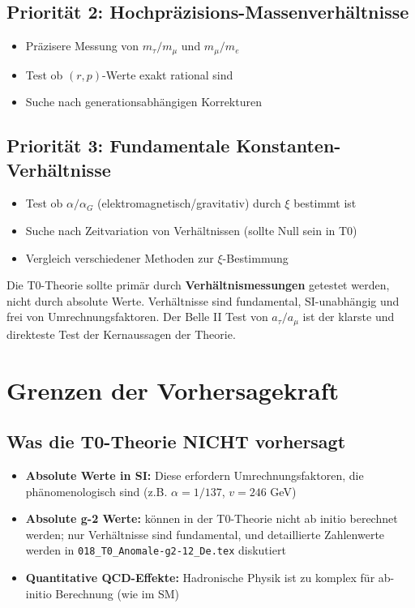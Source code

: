 \subsection{Priorität 2: Hochpräzisions-Massenverhältnisse}

\begin{itemize}
	\item Präzisere Messung von $m_\tau/m_\mu$ und $m_\mu/m_e$
	\item Test ob $(r,p)$-Werte exakt rational sind
	\item Suche nach generationsabhängigen Korrekturen
\end{itemize}

\subsection{Priorität 3: Fundamentale Konstanten-Verhältnisse}

\begin{itemize}
	\item Test ob $\alpha/\alpha_G$ (elektromagnetisch/gravitativ) durch $\xi$ bestimmt ist
	\item Suche nach Zeitvariation von Verhältnissen (sollte Null sein in T0)
	\item Vergleich verschiedener Methoden zur $\xi$-Bestimmung
\end{itemize}

\begin{keypoint}
	Die T0-Theorie sollte primär durch \textbf{Verhältnismessungen} getestet werden, 
	nicht durch absolute Werte. Verhältnisse sind fundamental, SI-unabhängig und 
	frei von Umrechnungsfaktoren. Der Belle II Test von $a_\tau/a_\mu$ ist der 
	klarste und direkteste Test der Kernaussagen der Theorie.
\end{keypoint}

\section{Grenzen der Vorhersagekraft}

\subsection{Was die T0-Theorie NICHT vorhersagt}

\begin{itemize}
	\item \textbf{Absolute Werte in SI:} Diese erfordern Umrechnungsfaktoren, die 
	phänomenologisch sind (z.B. $\alpha = 1/137$, $v = 246$ GeV)
	
	\item \textbf{Absolute g-2 Werte:} k\"onnen in der T0-Theorie nicht ab initio berechnet werden; nur Verh\"altnisse sind fundamental, und detaillierte Zahlenwerte werden in \texttt{018\_T0\_Anomale-g2-12\_De.tex} diskutiert
	
	\item \textbf{Quantitative QCD-Effekte:} Hadronische Physik ist zu komplex für 
	ab-initio Berechnung (wie im SM)
\end{itemize}

